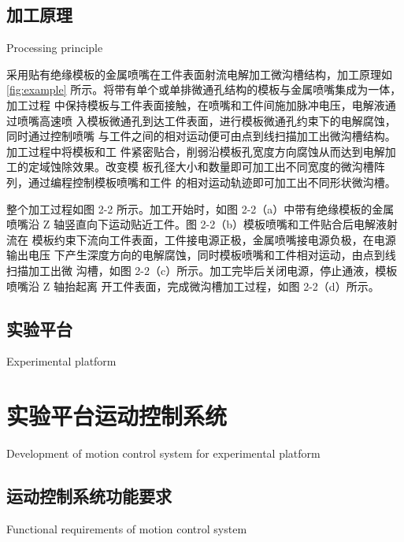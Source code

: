 \documentclass[
  type=doctor
]{../gdutthesis}
\begin{document}
\subsection{加工原理}{Processing principle}

采用贴有绝缘模板的金属喷嘴在工件表面射流电解加工微沟槽结构，加工原理如
\autoref{fig:example} 所示。将带有单个或单排微通孔结构的模板与金属喷嘴集成为一体，加工过程
中保持模板与工件表面接触，在喷嘴和工件间施加脉冲电压，电解液通过喷嘴高速喷
入模板微通孔到达工件表面，进行模板微通孔约束下的电解腐蚀，同时通过控制喷嘴
与工件之间的相对运动便可由点到线扫描加工出微沟槽结构。加工过程中将模板和工
件紧密贴合，削弱沿模板孔宽度方向腐蚀从而达到电解加工的定域蚀除效果。改变模
板孔径大小和数量即可加工出不同宽度的微沟槽阵列，通过编程控制模板喷嘴和工件
的相对运动轨迹即可加工出不同形状微沟槽。

\begin{figure}[h]
  \qquad
  \label{fig:example}
\end{figure}

整个加工过程如图 2-2 所示。加工开始时，如图 2-2（a）中带有绝缘模板的金属
喷嘴沿 Z 轴竖直向下运动贴近工件。图 2-2（b）模板喷嘴和工件贴合后电解液射流在
模板约束下流向工件表面，工件接电源正极，金属喷嘴接电源负极，在电源输出电压
下产生深度方向的电解腐蚀，同时模板喷嘴和工件相对运动，由点到线扫描加工出微
沟槽，如图 2-2（c）所示。加工完毕后关闭电源，停止通液，模板喷嘴沿 Z 轴抬起离
开工件表面，完成微沟槽加工过程，如图 2-2（d）所示。

\subsection{实验平台}{Experimental platform}

\section{实验平台运动控制系统}{Development of motion control system for experimental platform}

\subsection{运动控制系统功能要求}{Functional requirements of motion control system}
\end{document}
